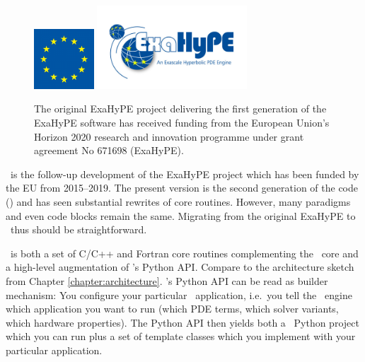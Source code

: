 \chapter{\ExaHyPE}
\label{section:python-api-examples:finite-volumes}


\begin{figure}[htb]
 \begin{center}
  \includegraphics[width=0.2\textwidth]{60_exahype/EU.png}
  \includegraphics[width=0.5\textwidth]{60_exahype/ExaHyPE_Logo.jpg}
 \end{center}
 \caption{
   The original ExaHyPE project delivering the first generation of the ExaHyPE
   software has received funding from the European Union’s Horizon 2020 research
   and innovation programme under grant agreement No 671698 (ExaHyPE).
 }
\end{figure}

\noindent
\ExaHyPE\ is the follow-up development of the ExaHyPE project which has been
funded by the EU from 2015--2019.
The present version is the second generation of the code (\ExaHyPE) and has
seen substantial rewrites of core routines.
However, many paradigms and even code blocks remain the same.
Migrating from the original ExaHyPE to \ExaHyPE\ thus should be straightforward.


\ExaHyPE\ is both a set of C/C++ and Fortran core routines complementing the
\Peano\ core and a high-level augmentation of \Peano's Python API.
Compare to the architecture sketch from Chapter \ref{chapter:architecture}.
\ExaHyPE's Python API can be read as builder mechanism:
You configure your particular \ExaHyPE\ application, i.e.~you tell the \ExaHyPE\
engine which application you want to run (which PDE terms, which solver
variants, which hardware properties).
The Python API then yields both a \Peano\ Python project which you can run plus
a set of template classes which you implement with your particular application.


